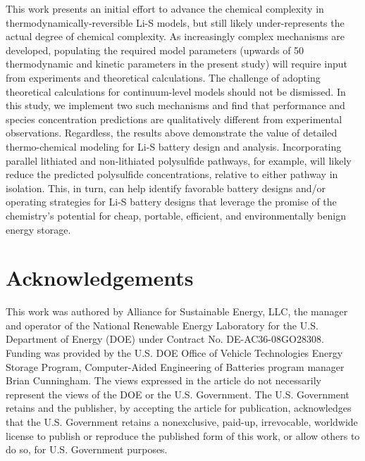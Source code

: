 \documentclass{elsarticle}
\begin{document}
This work presents an initial effort to advance the chemical complexity in thermodynamically-reversible Li-S models, but still likely under-represents the actual degree of chemical complexity.  As increasingly complex mechanisms are developed, populating the required model parameters (upwards of 50 thermodynamic and kinetic parameters in the present study) will require input from experiments and theoretical calculations. The challenge of adopting theoretical calculations for continuum-level models should not be dismissed. In this study, we implement two such mechanisms and find that performance and species concentration predictions are qualitatively different from experimental observations. Regardless, the results above demonstrate the value of detailed thermo-chemical modeling for Li-S battery design and analysis. Incorporating parallel lithiated and non-lithiated polysulfide pathways, for example, will likely reduce the predicted polysulfide concentrations, relative to either pathway in isolation.  This, in turn, can help identify favorable battery designs and/or operating strategies for Li-S battery designs that leverage the promise of the chemistry's potential for cheap, portable, efficient, and environmentally benign energy storage.

\section*{Acknowledgements}

This work was authored by Alliance for Sustainable Energy, LLC,
the manager and operator of the National Renewable Energy Laboratory for the U.S. Department of Energy (DOE) under Contract No. DE-AC36-08GO28308. Funding was provided by the U.S. DOE Office of Vehicle Technologies Energy Storage Program, Computer-Aided Engineering of Batteries program manager Brian Cunningham. The views expressed in the article do not necessarily represent the views of the DOE or the U.S. Government. The U.S. Government retains and the publisher, by accepting the article for publication, acknowledges that the U.S. Government retains a nonexclusive, paid-up, irrevocable, worldwide license to publish or reproduce the published form of this work, or allow others to do so, for U.S. Government purposes.

\newpage

\newpage
\end{document}
